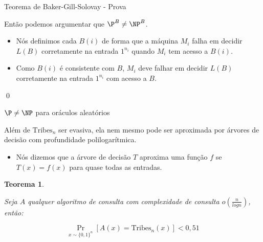 \documentclass[landscape, 9pt]{beamer}
\newtheorem{teo}{Teorema}
\newcommand{\binalph}{\{0, 1\}}
\newcommand{\binalphn}{\binalph^{n}}
\newcommand{\Tribes}{\text{Tribes}}
\begin{document}
\begin{frame} {Teorema de Baker-Gill-Solovay - Prova}

Então podemos argumentar que $\P^{B} \neq \NP^{B}$.

\begin{itemize}

	\item Nós definimos cada $B(i)$ de forma que a máquina $M_{i}$ falha em decidir $L(B)$ corretamente na entrada $1^{n_{i}}$ quando $M_{i}$ tem acesso a $B(i)$.
	
	\item Como $B(i)$ é consistente com $B$, $M_{i}$ deve falhar em decidir $L(B)$ corretamente na entrada $1^{n_{i}}$ com acesso a $B$.

\end{itemize}

\qed

\end{frame}


\begin{frame} {$\P \neq \NP$ para oráculos aleatórios} 

Além de $\Tribes_{n}$ ser evasiva, ela nem mesmo pode ser aproximada por árvores de decisão com profundidade polilogarítmica.

\begin{itemize}

	\item Nós dizemos que a árvore de decisão $T$ aproxima uma função $f$ se $T(x) = f(x)$ para quase todas as entradas.

\end{itemize}

\begin{teo} \label{tribes_inaproximability}

Seja $A$ qualquer algoritmo de consulta com complexidade de consulta $o(\frac{n}{logn})$, então:

\begin{equation*}
    \Pr_{x \sim \binalphn}[A(x) = \Tribes_{n}(x)] < 0,51
\end{equation*}

\end{teo}

\end{frame}

\end{document}
